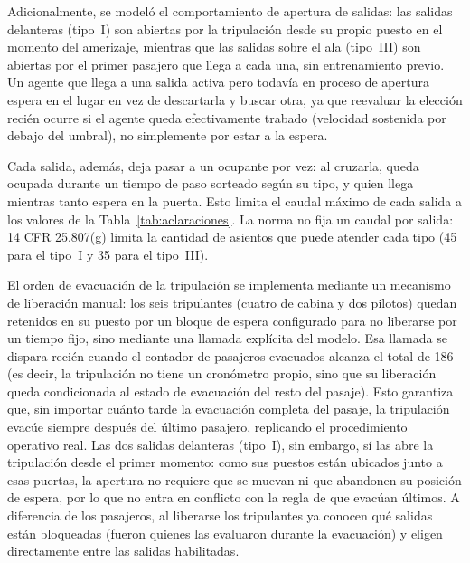 \documentclass[a4paper, 11pt]{article}
\begin{document}
Adicionalmente, se model\'o el comportamiento de apertura de salidas: las salidas
delanteras (tipo~I) son abiertas por la tripulaci\'on desde su propio puesto en el
momento del amerizaje, mientras que las salidas sobre el ala (tipo~III) son abiertas
por el primer pasajero que llega a cada una, sin entrenamiento previo. Un agente que
llega a una salida activa pero todav\'ia en proceso de apertura espera en el lugar
en vez de descartarla y buscar otra, ya que reevaluar la elecci\'on reci\'en ocurre
si el agente queda efectivamente trabado (velocidad sostenida por debajo del
umbral), no simplemente por estar a la espera.

Cada salida, adem\'as, deja pasar a un ocupante por vez: al cruzarla, queda ocupada
durante un tiempo de paso sorteado seg\'un su tipo, y quien llega mientras tanto
espera en la puerta. Esto limita el caudal m\'aximo de cada salida a los valores de
la Tabla~\ref{tab:aclaraciones}. La norma no fija un caudal por salida: 14 CFR
25.807(g) limita la cantidad de asientos que puede atender cada tipo (45 para el
tipo~I y 35 para el tipo~III).

El orden de evacuaci\'on de la tripulaci\'on se implementa mediante un mecanismo de
liberaci\'on manual: los seis tripulantes (cuatro de cabina y dos pilotos) quedan
retenidos en su puesto por un bloque de espera configurado para no liberarse por un
tiempo fijo, sino mediante una llamada expl\'icita del modelo. Esa llamada se
dispara reci\'en cuando el contador de pasajeros evacuados alcanza el total de 186
(es decir, la tripulaci\'on no tiene un cron\'ometro propio, sino que su liberaci\'on
queda condicionada al estado de evacuaci\'on del resto del pasaje). Esto garantiza
que, sin importar cu\'anto tarde la evacuaci\'on completa del pasaje, la
tripulaci\'on evac\'ue siempre despu\'es del \'ultimo pasajero, replicando el
procedimiento operativo real. Las dos salidas delanteras (tipo~I), sin embargo,
s\'i las abre la tripulaci\'on desde el primer momento: como sus puestos est\'an
ubicados junto a esas puertas, la apertura no requiere que se muevan ni que
abandonen su posici\'on de espera, por lo que no entra en conflicto con la regla de
que evac\'uan \'ultimos. A diferencia de los pasajeros, al liberarse los tripulantes
ya conocen qu\'e salidas est\'an bloqueadas (fueron quienes las evaluaron durante la
evacuaci\'on) y eligen directamente entre las salidas habilitadas.
\end{document}
